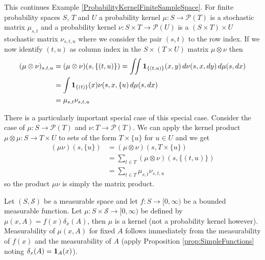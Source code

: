 \begin{examp}\label{ProbabilityKernelProductFiniteSampleSpace}
This continues Example \ref{ProbabilityKernelFiniteSampleSpace}.  For finite probability spaces $S$, $T$ and $U$ a probability kernel
$\mu : S  \to \mathcal{P}(T)$ is a stochastic matrix $\mu_{s,t}$ and a
probability kernel $\nu : S \times T \to \mathcal{P}(U)$ is a $(S
\times T) \times U$
stochastic matrix $\nu_{s,t, u}$ where we consider the pair $(s,t)$ to
the row index.  If we now identify $(t,u)$ as column index in the 
$S \times (T \times U)$ matrix $\mu \otimes \nu$ then 
\begin{align*}
(\mu \otimes
\nu)_{s,t,u} 
&= (\mu \otimes\nu)(s, \lbrace (t,u) \rbrace) = \iint
\textbf{1}_{\lbrace (t,u) \rbrace} (x,y) \, d\nu(s,x,dy) \,
d\mu(s, dx) \\
&= \int \textbf{1}_{\lbrace (t) \rbrace} (x) \nu(s,x, \lbrace{u}) \,
d\mu(s, dx) \\
&=\mu_{s,t} \nu_{s,t,u} 
\end{align*}

There is a particularly important special case of this special case.
Consider the case of $\mu : S \to \mathcal{P}(T)$  and $\nu : T \to
\mathcal{P}(T)$.  We can apply the kernel product $\mu \otimes \mu : S
\to T \times U$ to sets of the form $T \times \lbrace u \rbrace$ for
$u \in U$ and we get
\begin{align*}
(\mu \nu)(s, \lbrace u \rbrace) &= (\mu \otimes \nu)(s, T \times
\lbrace u \rbrace) \\
&=\sum_{t \in T}  (\mu \otimes \nu)(s,  \lbrace (t,u) \rbrace) \\
&= \sum_{t \in T} \mu_{s,t} \nu_{s,t,u} 
\end{align*}
so the product $\mu \nu$ is simply the matrix product.
\end{examp}

\begin{examp}
Let $(S, \mathcal{S})$ be a measurable space and let $f : S \to
[0,\infty)$ be a bounded measurable function.  Let $\mu : S \times \mathcal{S} \to [0,\infty)$ be defined by 
$\mu(x, A) = f(x) \delta_x(A)$, then $\mu$ is a kernel (not a probability kernel however).  Measurability of $\mu(x,A)$ for 
fixed $A$ follows immediately from the measurability of $f(x)$ and the measurability of $A$ (apply Proposition \ref{prop:SimpleFunctions} noting $\delta_x(A) = \textbf{1}_{A}(x)$).
\end{examp}

